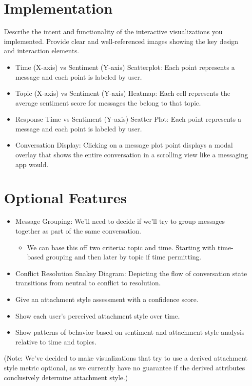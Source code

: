 \documentclass{article}\usepackage{graphicx}
\begin{document}
\section*{Implementation}
Describe the intent and functionality of the interactive visualizations you implemented. Provide clear and well-referenced images showing the key design and interaction elements.
\begin{itemize}
    \item Time (X-axis) vs Sentiment (Y-axis) Scatterplot: Each point represents a message and each point is labeled by user. 
    \item Topic (X-axis) vs Sentiment (Y-axis) Heatmap: Each cell represents the average sentiment score for messages the belong to that topic. 
    \item Response Time vs Sentiment (Y-axis) Scatter Plot: Each point represents a message and each point is labeled by user. 
    \item Conversation Display: Clicking on a message plot point displays a modal overlay that shows the entire conversation in a scrolling view like a messaging app would.
\end{itemize}

\section*{Optional Features}
\begin{itemize}
    \item Message Grouping: We’ll need to decide if we’ll try to group messages together as part of the same conversation.
        \begin{itemize}
            \item We can base this off two criteria: topic and time. Starting with time-based grouping and then later by topic if time permitting.
        \end{itemize}
    \item Conflict Resolution Snakey Diagram: Depicting the flow of conversation state transitions from neutral to conflict to resolution.
    \item Give an attachment style assessment with a confidence score.
    \item Show each user's perceived attachment style over time.
    \item Show patterns of behavior based on sentiment and attachment style analysis relative to time and topics.
\end{itemize}
(Note: We’ve decided to make visualizations that try to use a derived attachment style metric optional, as we currently have no guarantee if the derived attributes conclusively determine attachment style.)
\end{document}

